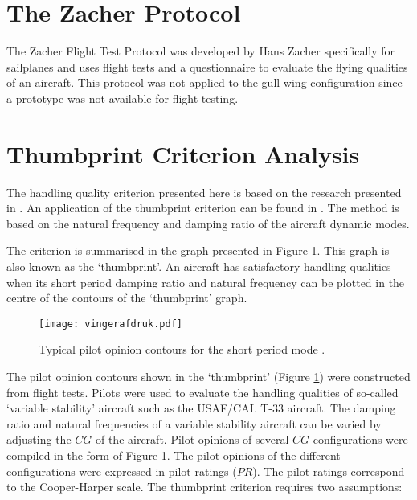 \documentclass{report}
\begin{document}
\section{The Zacher Protocol}


The Zacher Flight Test Protocol \citep{SailPlaneDesign} was developed by Hans Zacher specifically for sailplanes and uses flight tests and a questionnaire to evaluate the flying qualities of an aircraft.  This protocol was not applied to the gull-wing configuration since a prototype was not available for flight testing.

\section{Thumbprint Criterion Analysis}\label{sec: perfcriteria}


The handling quality criterion presented here is based on the research presented in \cite{OHara}.  An application of the thumbprint criterion can be found in .
The method is based on the natural frequency and damping ratio of the aircraft dynamic modes.  

The criterion is summarised in the graph presented in Figure \ref{fig: shortperiodopinion}.  This graph is also known as the `thumbprint'.  An aircraft has satisfactory handling qualities when its short period damping ratio and natural frequency can be plotted in the centre of the contours of the `thumbprint' graph.  

\begin{figure}[htb]
	\begin{center}
		\texttt{[image: vingerafdruk.pdf]}
	\end{center}

	\caption{Typical pilot opinion contours for the short period mode \citep{OHara}.}
	\label{fig: shortperiodopinion}
\end{figure}


The pilot opinion contours shown in the `thumbprint' (Figure \ref{fig: shortperiodopinion}) were constructed from flight tests.  Pilots were used to evaluate the handling qualities of so-called `variable stability' aircraft such as the USAF/CAL \mbox{T-33}  aircraft.  The damping ratio and natural frequencies of a variable stability aircraft can be varied by adjusting the $CG$ of the aircraft.  Pilot opinions of several $CG$ configurations were compiled in the form of Figure \ref{fig: shortperiodopinion}.  The pilot opinions of the different configurations were expressed in pilot ratings ($PR$).   The pilot ratings correspond to the Cooper-Harper scale.  The thumbprint criterion requires two assumptions:
\end{document}
